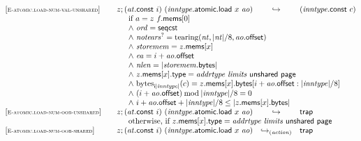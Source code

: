 $$
\begin{array}[t]{@{}lrcl@{}l@{}}
{[\textsc{\scriptsize E{-}atomic.load{-}num{-}val{-}unshared}]} \quad & z ; ({\mathit{at}}{.}\mathsf{const}~i)~({\mathit{inntype}}{.}\mathsf{atomic}{.}\mathsf{load}~x~{\mathit{ao}}) & \hookrightarrow & ({\mathit{inntype}}{.}\mathsf{const}~c) &  \\
& \multicolumn{4}{@{}l@{}}{\quad
\quad
\begin{array}[t]{@{}l@{}}
\mbox{if}~ a = z~f{.}\mathsf{mems}{}[0] \\
{\land}~ {\mathit{ord}} = \mathsf{seqcst} \\
{\land}~ {{\mathit{notears}}^?} = {\mathrm{tearing}}({\mathit{nt}}, {|{\mathit{nt}}|} / 8, {\mathit{ao}}{.}\mathsf{offset}) \\
{\land}~ {\mathit{storemem}} = z{.}\mathsf{mems}{}[x] \\
{\land}~ {\mathit{ea}} = i + {\mathit{ao}}{.}\mathsf{offset} \\
{\land}~ {\mathit{nlen}} = {|{\mathit{storemem}}{.}\mathsf{bytes}|} \\
{\land}~ z{.}\mathsf{mems}{}[x]{.}\mathsf{type} = {\mathit{addrtype}}~{\mathit{limits}}~\mathsf{unshared}~\mathsf{page} \\
{\land}~ {{\mathrm{bytes}}}_{{\mathsf{i}}{{|{\mathit{inntype}}|}}}(c) = z{.}\mathsf{mems}{}[x]{.}\mathsf{bytes}{}[i + {\mathit{ao}}{.}\mathsf{offset} : {|{\mathit{inntype}}|} / 8] \\
{\land}~ (i + {\mathit{ao}}{.}\mathsf{offset}) \mathbin{\mathrm{mod}} {|{\mathit{inntype}}|} / 8 = 0 \\
{\land}~ i + {\mathit{ao}}{.}\mathsf{offset} + {|{\mathit{inntype}}|} / 8 \leq {|z{.}\mathsf{mems}{}[x]{.}\mathsf{bytes}|} \\
\end{array}
} \\
{[\textsc{\scriptsize E{-}atomic.load{-}num{-}oob{-}unshared}]} \quad & z ; ({\mathit{at}}{.}\mathsf{const}~i)~({\mathit{inntype}}{.}\mathsf{atomic}{.}\mathsf{load}~x~{\mathit{ao}}) & \hookrightarrow & \mathsf{trap} &  \\
& \multicolumn{4}{@{}l@{}}{\quad
\quad \mbox{otherwise, if}~ z{.}\mathsf{mems}{}[x]{.}\mathsf{type} = {\mathit{addrtype}}~{\mathit{limits}}~\mathsf{unshared}~\mathsf{page}
} \\
{[\textsc{\scriptsize E{-}atomic.load{-}num{-}oob{-}shared}]} \quad & z ; ({\mathit{at}}{.}\mathsf{const}~i)~({\mathit{inntype}}{.}\mathsf{atomic}{.}\mathsf{load}~x~{\mathit{ao}}) & {\hookrightarrow}_{({\mathit{action}})} {} & \mathsf{trap} &  \\

\end{array}$$
